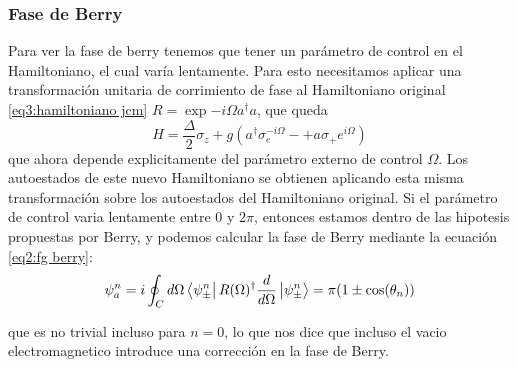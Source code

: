\subsubsection{Fase de Berry}
Para ver la fase de berry tenemos que tener un parámetro de control en el Hamiltoniano, el cual varía lentamente. Para esto necesitamos aplicar una transformación unitaria de corrimiento de fase al Hamiltoniano original \ref{eq3:hamiltoniano jcm} $R=\exp{-i\Omega a^\dagger a}$, que queda
\begin{equation}
    H=\frac{\Delta}{2}\sigma_z+g(a^\dagger \sigma_e^{-i\Omega}-+a\sigma_+e^{i\Omega})
\end{equation}
que ahora depende explicitamente del parámetro externo de control $\Omega$. Los autoestados de este nuevo Hamiltoniano se obtienen aplicando esta misma transformación sobre los autoestados del Hamiltoniano original. Si el parámetro de control varia lentamente entre 0 y $2\pi$, entonces estamos dentro de las hipotesis propuestas por Berry, y podemos calcular la fase de Berry mediante la ecuación \ref{eq2:fg berry}:
\begin{equation}
    \psi_a^n=i\oint_Cd\Omega\bra{\psi_\pm^n}R(\Omega)^\dagger \frac{d}{d\Omega}\ket{\psi_\pm^n}=\pi(1\pm \cos(\theta_n))
\end{equation}

que es no trivial incluso para $n=0$, lo que nos dice que incluso el vacio electromagnetico introduce una corrección en la fase de Berry.
